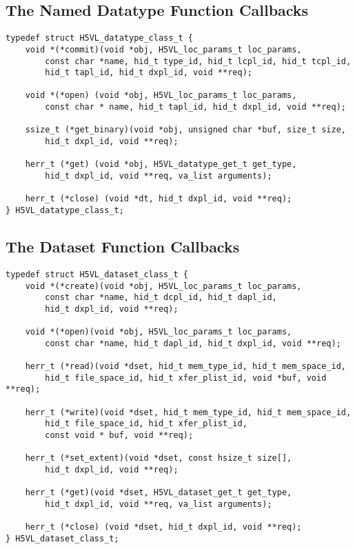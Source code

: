 


\subsection{The Named Datatype Function Callbacks}

\begin{lstlisting}
typedef struct H5VL_datatype_class_t {
    void *(*commit)(void *obj, H5VL_loc_params_t loc_params, 
        const char *name, hid_t type_id, hid_t lcpl_id, hid_t tcpl_id, 
        hid_t tapl_id, hid_t dxpl_id, void **req);

    void *(*open) (void *obj, H5VL_loc_params_t loc_params, 
        const char * name, hid_t tapl_id, hid_t dxpl_id, void **req);

    ssize_t (*get_binary)(void *obj, unsigned char *buf, size_t size, 
        hid_t dxpl_id, void **req);

    herr_t (*get) (void *obj, H5VL_datatype_get_t get_type, 
        hid_t dxpl_id, void **req, va_list arguments);

    herr_t (*close) (void *dt, hid_t dxpl_id, void **req);
} H5VL_datatype_class_t;
\end{lstlisting}

\subsection{The Dataset Function Callbacks}

\begin{lstlisting}
typedef struct H5VL_dataset_class_t {
    void *(*create)(void *obj, H5VL_loc_params_t loc_params, 
        const char *name, hid_t dcpl_id, hid_t dapl_id, 
        hid_t dxpl_id, void **req);

    void *(*open)(void *obj, H5VL_loc_params_t loc_params, 
        const char *name, hid_t dapl_id, hid_t dxpl_id, void **req);

    herr_t (*read)(void *dset, hid_t mem_type_id, hid_t mem_space_id, 
        hid_t file_space_id, hid_t xfer_plist_id, void *buf, void **req);

    herr_t (*write)(void *dset, hid_t mem_type_id, hid_t mem_space_id, 
        hid_t file_space_id, hid_t xfer_plist_id, 
        const void * buf, void **req);

    herr_t (*set_extent)(void *dset, const hsize_t size[], 
        hid_t dxpl_id, void **req);

    herr_t (*get)(void *dset, H5VL_dataset_get_t get_type, 
        hid_t dxpl_id, void **req, va_list arguments);

    herr_t (*close) (void *dset, hid_t dxpl_id, void **req);
} H5VL_dataset_class_t;
\end{lstlisting}

